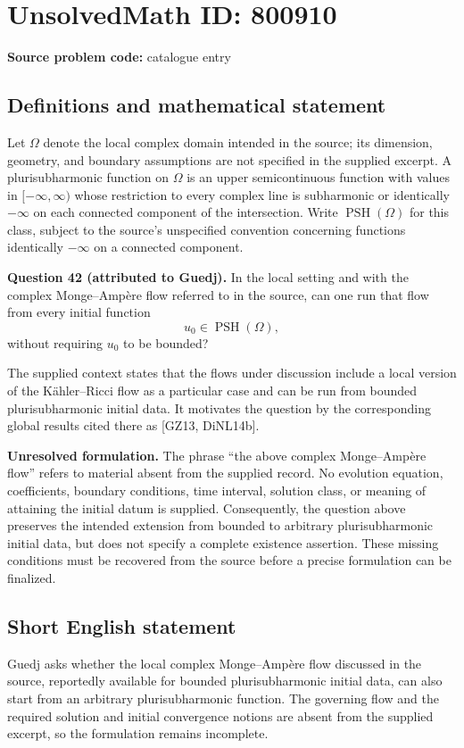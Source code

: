 \documentclass[11pt]{article}
\begin{document}
\section*{UnsolvedMath ID: 800910}
\textbf{Source problem code:} catalogue entry
\subsection{Definitions and mathematical statement}
Let \(\Omega\) denote the local complex domain intended in the source; its dimension, geometry, and boundary assumptions are not specified in the supplied excerpt. A plurisubharmonic function on \(\Omega\) is an upper semicontinuous function with values in \([-\infty,\infty)\) whose restriction to every complex line is subharmonic or identically \(-\infty\) on each connected component of the intersection. Write \(\operatorname{PSH}(\Omega)\) for this class, subject to the source's unspecified convention concerning functions identically \(-\infty\) on a connected component.

\textbf{Question 42 (attributed to Guedj).} In the local setting and with the complex Monge--Amp\`ere flow referred to in the source, can one run that flow from every initial function
\[
 u_0\in\operatorname{PSH}(\Omega),
\]
without requiring \(u_0\) to be bounded?

The supplied context states that the flows under discussion include a local version of the K\"ahler--Ricci flow as a particular case and can be run from bounded plurisubharmonic initial data. It motivates the question by the corresponding global results cited there as [GZ13, DiNL14b].

\textbf{Unresolved formulation.} The phrase ``the above complex Monge--Amp\`ere flow'' refers to material absent from the supplied record. No evolution equation, coefficients, boundary conditions, time interval, solution class, or meaning of attaining the initial datum is supplied. Consequently, the question above preserves the intended extension from bounded to arbitrary plurisubharmonic initial data, but does not specify a complete existence assertion. These missing conditions must be recovered from the source before a precise formulation can be finalized.
\subsection{Short English statement}
Guedj asks whether the local complex Monge--Amp\`ere flow discussed in the source, reportedly available for bounded plurisubharmonic initial data, can also start from an arbitrary plurisubharmonic function. The governing flow and the required solution and initial convergence notions are absent from the supplied excerpt, so the formulation remains incomplete.
\end{document}
